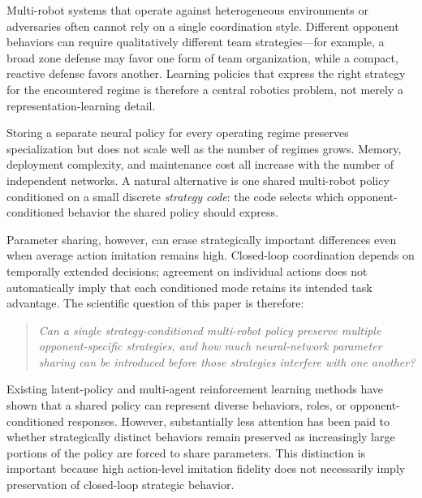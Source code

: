 \documentclass{article}
\begin{document}
Multi-robot systems that operate against heterogeneous environments or
adversaries often cannot rely on a single coordination style. Different opponent
behaviors can require qualitatively different team strategies---for example, a
broad zone defense may favor one form of team organization, while a compact,
reactive defense favors another. Learning policies that express the right
strategy for the encountered regime is therefore a central robotics problem,
not merely a representation-learning detail.

Storing a separate neural policy for every operating regime preserves
specialization but does not scale well as the number of regimes grows. Memory,
deployment complexity, and maintenance cost all increase with the number of
independent networks. A natural alternative is one shared multi-robot policy
conditioned on a small discrete \emph{strategy code}: the code selects which
opponent-conditioned behavior the shared policy should express.

Parameter sharing, however, can erase strategically important differences even
when average action imitation remains high. Closed-loop coordination depends on
temporally extended decisions; agreement on individual actions does not
automatically imply that each conditioned mode retains its intended task
advantage. The scientific question of this paper is therefore:

\begin{quote}
\emph{Can a single strategy-conditioned multi-robot policy preserve multiple
opponent-specific strategies, and how much neural-network parameter sharing can
be introduced before those strategies interfere with one another?}
\end{quote}

Existing latent-policy and multi-agent reinforcement learning methods have shown
that a shared policy can represent diverse behaviors, roles, or
opponent-conditioned responses. However, substantially less attention has been
paid to whether strategically distinct behaviors remain preserved as
increasingly large portions of the policy are forced to share parameters. This
distinction is important because high action-level imitation fidelity does not
necessarily imply preservation of closed-loop strategic behavior.
\end{document}
